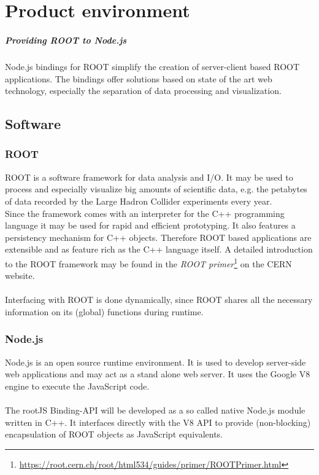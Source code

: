 \chapter{Product environment}

\paragraph{Providing ROOT to Node.js}
Node.js bindings for ROOT simplify the creation of server-client based ROOT applications. The bindings offer solutions based on state of the art web technology, especially the separation of data 
processing and visualization.\\

\section{Software}
\subsection{ROOT}

ROOT is a software framework for data analysis and I/O. It may be used to process and especially visualize big amounts of scientific data, e.g. the petabytes of data recorded by the Large Hadron Collider experiments every year.\\
Since the framework comes with an interpreter for the C++ programming language it may be used for rapid and efficient prototyping. It also features a persistency mechanism for C++ objects. Therefore ROOT based applications are extensible and as feature rich as the C++ language itself.
A detailed introduction to the ROOT framework may be found in the \textit{ROOT  primer}\footnote[1]{\url{https://root.cern.ch/root/html534/guides/primer/ROOTPrimer.html}}
on the CERN website. \\ \\
Interfacing with ROOT is done dynamically, since ROOT shares all the necessary information on its (global) functions during runtime.

\subsection{Node.js}

Node.js is an open source runtime environment. It is used to develop server-side web applications and may act as a stand alone web server. It uses the Google V8 engine to execute the JavaScript code. \\ \\
The rootJS Binding-API will be developed as a so called native Node.js module written in C++. It interfaces directly with the V8 API to provide (non-blocking) encapsulation of ROOT objects as JavaScript equivalents.

